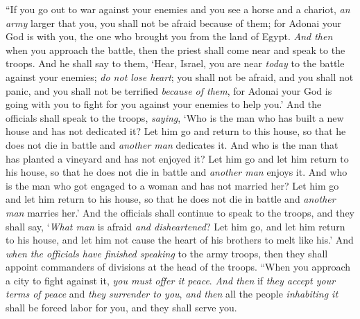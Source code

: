 \begin{biblechapter} %
\verse “If you go out to war against your enemies and you see a horse and a chariot, \textit{an army} larger that you, you shall not be afraid because of them; for Adonai your God is with you, the one who brought you from the land of Egypt.
\verse \textit{And then} when you approach the battle, then the priest shall come near and speak to the troops.
\verse And he shall say to them, ‘Hear, Israel, you are near \textit{today} to the battle against your enemies; \textit{do not lose heart}; you shall not be afraid, and you shall not panic, and you shall not be terrified \textit{because of them},
\verse for Adonai your God is going with you to fight for you against your enemies to help you.’
\verse And the officials shall speak to the troops, \textit{saying}, ‘Who is the man who has built a new house and has not dedicated it? Let him go and return to this house, so that he does not die in battle and \textit{another man} dedicates it.
\verse And who is the man that has planted a vineyard and has not enjoyed it? Let him go and let him return to his house, so that he does not die in battle and \textit{another man} enjoys it.
\verse And who is the man who got engaged to a woman and has not married her? Let him go and let him return to his house, so that he does not die in battle and \textit{another man} marries her.’
\verse And the officials shall continue to speak to the troops, and they shall say, ‘\textit{What man} is afraid \textit{and disheartened}? Let him go, and let him return to his house, and let him not cause the heart of his brothers to melt like his.’
\verse And \textit{when the officials have finished speaking} to the army troops, then they shall appoint commanders of divisions at the head of the troops.
\verse “When you approach a city to fight against it, \textit{you must offer it peace}.
\verse \textit{And then} if \textit{they accept your terms of peace} and \textit{they surrender to you}, \textit{and then} all the people \textit{inhabiting it} shall be forced labor for you, and they shall serve you.

\end{biblechapter}
